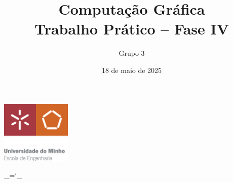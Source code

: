 \documentclass[12pt, a4paper]{article}
\title{\Huge \textbf{Computação Gráfica \\ \Large Trabalho Prático -- Fase IV}}
\date{18 de maio de 2025}
\author{Grupo 3}
\begin{document}
\begin{center}
    \includegraphics[width=0.25\textwidth]{res/cover/EE-C.eps}
\end{center}

\chardef\_=`_
\onehalfspacing
\setlength{\parskip}{\baselineskip}
\setlength{\parindent}{0pt}
\def\arraystretch{1.5}

{\let\newpage\relax\maketitle}
\maketitle
\thispagestyle{empty}

\vspace*{\fill}
\end{document}
